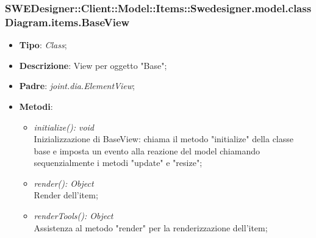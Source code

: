\documentclass[../DefinizioneDiProdotto.tex]{subfiles}
\begin{document}
			\subsubsection{SWEDesigner::Client::Model::Items::Swedesigner.model.classDiagram.items.BaseView}
			\hypertarget{SWEDesigner::Client::Model::Items::Swedesigner.model.classDiagram.items.BaseView}{}
			\begin{itemize}
				\item \textbf{Tipo}: \emph{Class};
				\item \textbf{Descrizione}: View per oggetto "Base";
				\item \textbf{Padre}: \emph{joint.dia.ElementView};
				\item \textbf{Metodi}:
				\begin{itemize}
					\item \emph{initialize(): void}\\
					Inizializzazione di BaseView: chiama il metodo "initialize" della classe base e imposta un evento alla reazione del model chiamando sequenzialmente i metodi "update" e "resize";
					\item \emph{render(): Object}\\
					Render dell'item;
					\item \emph{renderTools(): Object}\\
					Assistenza al metodo "render" per la renderizzazione dell'item;
				\end{itemize}
			\end{itemize}
			
\end{document}
